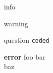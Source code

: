 \begin{Information}
info
\end{Information}
\begin{Warning}
warning
\end{Warning}
\begin{Question}
question \texttt{coded}
\end{Question}
\begin{Error}
\textbf{error}
foo bar \\
baz
\end{Error}
